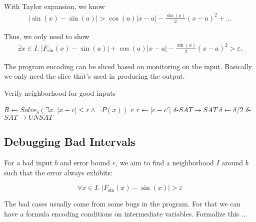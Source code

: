 With Taylor expansion, we know
\begin{eqnarray}
|\sin(x) - \sin(a)| > \cos(a) |x - a| - \frac{\sin(a)}{2}(x-a)^2 + ... %
\end{eqnarray}

Thus, we only need to show
\begin{eqnarray}
\exists x\in I.\; |F_{\sin}(x) - \sin(a)| + \cos(a) |x - a| -
\frac{\sin(a)}{2}(x-a)^2 > \varepsilon.
\end{eqnarray}

The program encoding can be sliced based on monitoring on the input.
Basically we only need the slice that's used in producing the output.

\begin{algorithm}
  \centering
  \caption{Verify neighborhood for good inputs}
  \begin{algorithmic}[1]
            \State $R \gets Solve_{\delta}(\exists x. \; |x - c| \le r \land \neg P(x))$
                \State \Return $r$
                    \State $r \gets |c - c'|$
                    \Comment $\delta$-$SAT \to SAT$
                \Else
                    \State $\delta \gets \delta / 2$
                    \Comment $\delta$-$SAT \to UNSAT$
                \EndIf
            \EndIf
        \EndWhile
    \EndProcedure
  \end{algorithmic}
\end{algorithm}

\subsection{Debugging Bad Intervals}

For a bad input $b$ and error bound $\varepsilon$, we aim to find a
neighborhood $I$ around $b$ such that the error always exhibits:

$$ \forall x\in I.\; |F_{\sin}(x) - \sin(x)| > \varepsilon$$

The bad cases usually come from some bugs in the program. For that we
can have a formula encoding conditions on intermediate variables.
Formalize this ...

